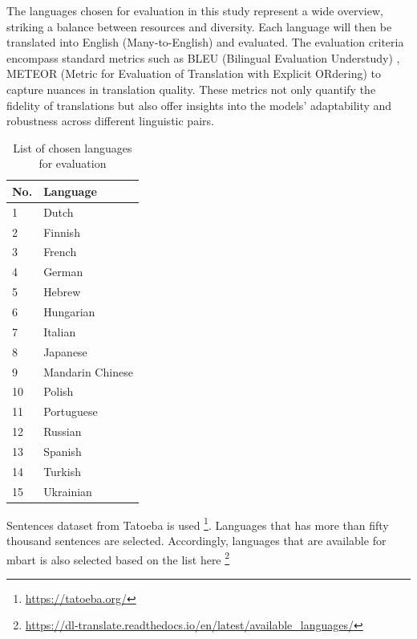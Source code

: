 \documentclass[a4paper]{article}
\begin{document}
The languages chosen for evaluation in this study represent a wide overview, striking a balance between resources and diversity. Each language will then be translated into English (Many-to-English) and evaluated. The evaluation criteria encompass standard metrics such as BLEU (Bilingual Evaluation Understudy) \cite{papieni-2002-bleu}, METEOR (Metric for Evaluation of Translation with Explicit ORdering) \cite{lavie-2007-meteor} to capture nuances in translation quality. These metrics not only quantify the fidelity of translations but also offer insights into the models' adaptability and robustness across different linguistic pairs.

\begin{table}[htbp]
    \centering
    \begin{tabular}{|l|l|}
        \hline
        \textbf{No.} & \textbf{Language} \\
        \hline
        1            & Dutch             \\
        2            & Finnish           \\
        3            & French            \\
        4            & German            \\
        5            & Hebrew            \\
        6            & Hungarian         \\
        7            & Italian           \\
        8            & Japanese          \\
        9            & Mandarin Chinese  \\
        10           & Polish            \\
        11           & Portuguese        \\
        12           & Russian           \\
        13           & Spanish           \\
        14           & Turkish           \\
        15           & Ukrainian         \\
        \hline
    \end{tabular}
    \caption{List of chosen languages for evaluation}
\end{table}

Sentences dataset from Tatoeba is used \footnote{\url{https://tatoeba.org/}}. Languages that has more than fifty thousand sentences are selected. Accordingly, languages that are available for mbart is also selected based on the list here \footnote{\url{https://dl-translate.readthedocs.io/en/latest/available_languages/}}
\end{document}
